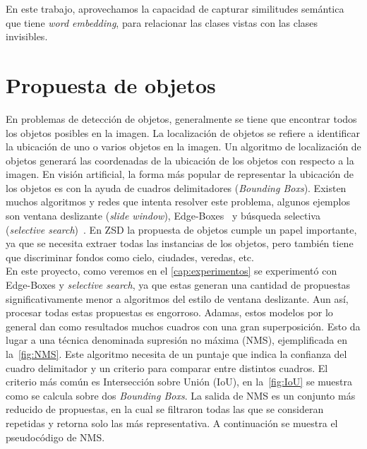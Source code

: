 En este trabajo, aprovechamos la capacidad de capturar similitudes semántica que tiene \textit{word embedding}, para relacionar las clases vistas con las clases invisibles.\\


\section{Propuesta de objetos} \label{sec:propuestadeobjetos}
En problemas de detección de objetos, generalmente se tiene que encontrar todos los objetos posibles en la imagen. La localización de objetos se refiere a identificar la ubicación de uno o varios objetos en la imagen. Un algoritmo de localización de objetos generará las coordenadas de la ubicación de los objetos con respecto a la imagen. En visión artificial, la forma más popular de representar la ubicación de los objetos es con la ayuda de cuadros delimitadores (\textit{Bounding Boxs}). Existen muchos algoritmos y redes que intenta resolver este problema, algunos ejemplos son ventana deslizante (\textit{slide window}), Edge-Boxes~\cite{zitnick2014edge} y búsqueda selectiva (\textit{selective search})~\cite{uijlings2013selective}. En ZSD la propuesta de objetos cumple un papel importante, ya que se necesita extraer todas las instancias de los objetos, pero también tiene que discriminar fondos como cielo, ciudades, veredas, etc.\\

En este proyecto, como veremos en el \autoref{cap:experimentos} se experimentó con Edge-Boxes y \textit{selective search}, ya que estas generan una cantidad de propuestas significativamente menor a algoritmos del estilo de ventana deslizante. Aun así, procesar todas estas propuestas es engorroso. Adamas, estos modelos por lo general dan como resultados muchos cuadros con una gran superposición. Esto da lugar a una técnica denominada supresión no máxima (NMS), ejemplificada en la~\autoref{fig:NMS}. Este algoritmo necesita de un puntaje que indica la confianza del cuadro delimitador y un criterio para comparar entre distintos cuadros. El criterio más común es Intersección sobre Unión (IoU), en la~\autoref{fig:IoU} se muestra como se calcula sobre dos \textit{Bounding Boxs}. La salida de NMS es un conjunto más reducido de propuestas, en la cual se filtraron todas las que se consideran repetidas y retorna solo las más representativa. A continuación se muestra el pseudocódigo de NMS.

\begin{center}
\noindent{}
\end{center}

